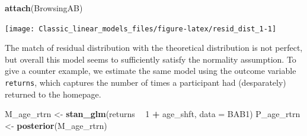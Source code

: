\documentclass[]{svmono}
\newenvironment{Shaded}{\begin{snugshade}}{\end{snugshade}}
\newcommand{\KeywordTok}[1]{\textcolor[rgb]{0.13,0.29,0.53}{\textbf{#1}}}
\newcommand{\DataTypeTok}[1]{\textcolor[rgb]{0.13,0.29,0.53}{#1}}
\newcommand{\DecValTok}[1]{\textcolor[rgb]{0.00,0.00,0.81}{#1}}
\newcommand{\StringTok}[1]{\textcolor[rgb]{0.31,0.60,0.02}{#1}}
\newcommand{\OperatorTok}[1]{\textcolor[rgb]{0.81,0.36,0.00}{\textbf{#1}}}
\newcommand{\NormalTok}[1]{#1}
\begin{document}
\begin{Shaded}
\begin{Highlighting}[]
\KeywordTok{attach}\NormalTok{(BrowsingAB)}
\end{Highlighting}
\end{Shaded}

\begin{Shaded}
\end{Shaded}

\texttt{[image: Classic\_linear\_models\_files/figure-latex/resid\_dist\_1-1]}

The match of residual distribution with the theoretical distribution is
not perfect, but overall this model seems to sufficiently satisfy the
normality assumption. To give a counter example, we estimate the same
model using the outcome variable \texttt{returns}, which captures the
number of times a participant had (desparately) returned to the
homepage.

\begin{Shaded}
\begin{Highlighting}[]
\NormalTok{M_age_rtrn <-}\StringTok{ }
\StringTok{  }\KeywordTok{stan_glm}\NormalTok{(returns }\OperatorTok{~}\StringTok{ }\DecValTok{1} \OperatorTok{+}\StringTok{ }\NormalTok{age_shft, }\DataTypeTok{data =}\NormalTok{ BAB1)}
\NormalTok{P_age_rtrn <-}\StringTok{ }\KeywordTok{posterior}\NormalTok{(M_age_rtrn)}
\end{Highlighting}
\end{Shaded}
\end{document}

